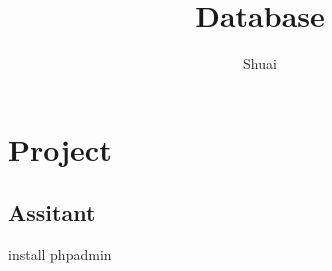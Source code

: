 \documentclass{book}
\title{Database}
\author{Shuai}
\begin{document}
\chapter{Project}
\section{Assitant}
install phpadmin
\end{document}
